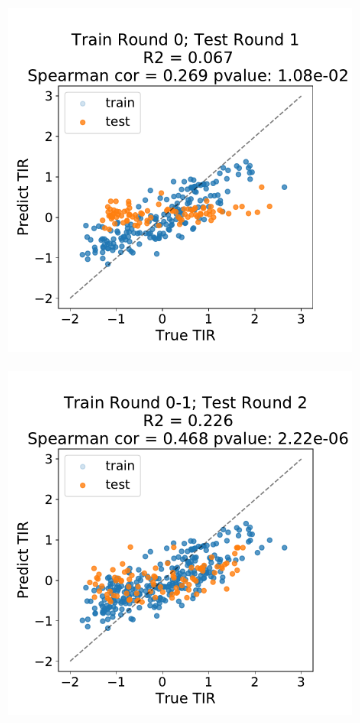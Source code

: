 \documentclass{article}
\begin{document}
\begin{figure}[!ht]
    \centering
    \begin{subfigure}[b]{0.49\textwidth}
        \centering
        \caption{}
        \includegraphics[scale=0.4]{plots/Main_Paper/scatter_abc1_FF_0.pdf}
    \end{subfigure}
    \begin{subfigure}[b]{0.49\textwidth}
        \centering
        \caption{}
        \includegraphics[scale=0.4]{plots/Main_Paper/scatter_abc1_FF_1.pdf}

\end{subfigure}
\end{figure}
\end{document}
